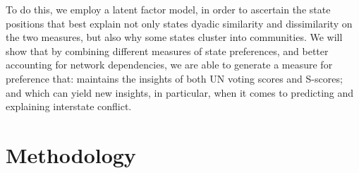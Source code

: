 To do this, we employ a latent factor model, in order to ascertain the state positions that best explain not only states dyadic similarity and dissimilarity on the two measures, but also why some states cluster into communities. We will show that by combining different measures of state preferences, and better accounting for network dependencies, we are able to generate a measure for preference that: maintains the insights of both UN voting scores and S-scores; and which can yield new insights, in particular, when it comes to predicting and explaining interstate conflict.

\section*{Methodology}






